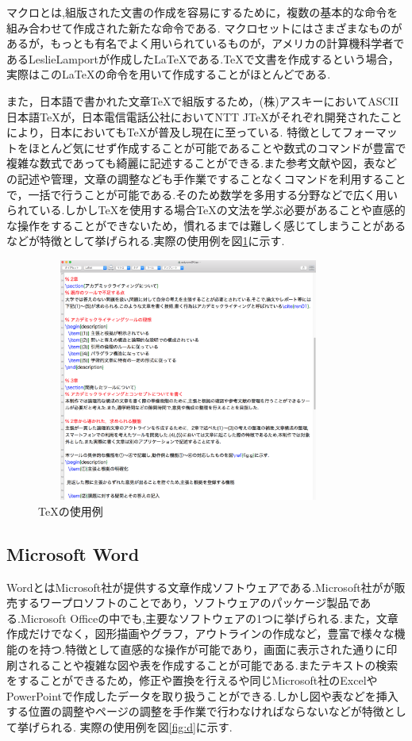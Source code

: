 \documentclass[a4j,12pt]{jarticle}
\begin{document}
マクロとは,組版された文書の作成を容易にするために，複数の基本的な命令を組み合わせて作成された新たな命令である.
マクロセットにはさまざまなものがあるが，もっとも有名でよく用いられているものが，アメリカの計算機科学者であるLeslieLamportが作成した\LaTeX である.\TeX で文書を作成するという場合，実際はこの\LaTeX の命令を用いて作成することがほとんどである.

また，日本語で書かれた文章\TeX で組版するため，(株)アスキーにおいてASCII日本語\TeX が，日本電信電話公社においてNTT J\TeX がそれぞれ開発されたことにより，日本においても\TeX が普及し現在に至っている\cite{ren3}.
特徴としてフォーマットをほとんど気にせず作成することが可能であることや数式のコマンドが豊富で複雑な数式であっても綺麗に記述することができる.また参考文献や図，表などの記述や管理，文章の調整なども手作業ですることなくコマンドを利用することで，一括で行うことが可能である.そのため数学を多用する分野などで広く用いられている.しかし\TeX を使用する場合\TeX の文法を学ぶ必要があることや直感的な操作をすることができないため，慣れるまでは難しく感じてしまうことがあるなどが特徴として挙げられる.実際の使用例を図\ref{fig:c}に示す.

\begin{figure}[H]
\begin{center}
 \includegraphics[clip,width=100mm,height=80mm]{figure/TEX.png}
 \end{center}
 \caption{\TeX の使用例}
 \label{fig:c}
\end{figure}

\newpage
\subsection{Microsoft Word}
WordとはMicrosoft社が提供する文章作成ソフトウェアである.Microsoft社がが販売するワープロソフトのことであり，ソフトウェアのパッケージ製品である.Microsoft Officeの中でも,主要なソフトウェアの1つに挙げられる.また，文章作成だけでなく，図形描画やグラフ，アウトラインの作成など，豊富で様々な機能のを持つ.特徴として直感的な操作が可能であり，画面に表示された通りに印刷されることや複雑な図や表を作成することが可能である.またテキストの検索をすることができるため，修正や置換を行えるや同じMicrosoft社のExcelやPowerPointで作成したデータを取り扱うことができる.しかし図や表などを挿入する位置の調整やページの調整を手作業で行わなければならないなどが特徴として挙げられる.
実際の使用例を図\ref{fig:d}に示す.
\end{document}
